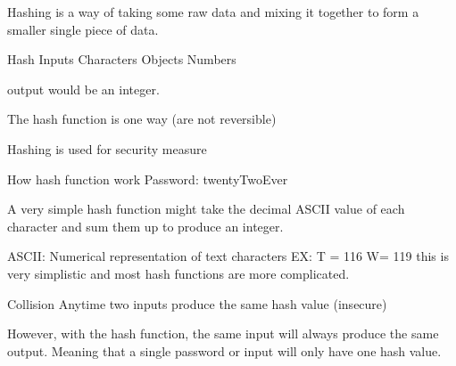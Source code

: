 Hashing 
  is a way of taking some raw data and mixing it together to form a smaller single piece of data.

Hash Inputs 
  Characters 
  Objects 
  Numbers 

output 
  would be an integer. 


The hash function is one way (are not reversible)

Hashing is used for security measure 

How hash function work 
  Password: twentyTwoEver

  A very simple hash function might take the decimal ASCII value of each character and sum them up to produce an integer.

ASCII:
  Numerical representation of text characters 
  EX:
    T = 116 
    W= 119 
  this is very simplistic and most hash functions are more complicated.

Collision
  Anytime two inputs produce the same hash value (insecure)

However, with the hash function, the same input will always produce the same output.
Meaning that a single password or input will only have one hash value.